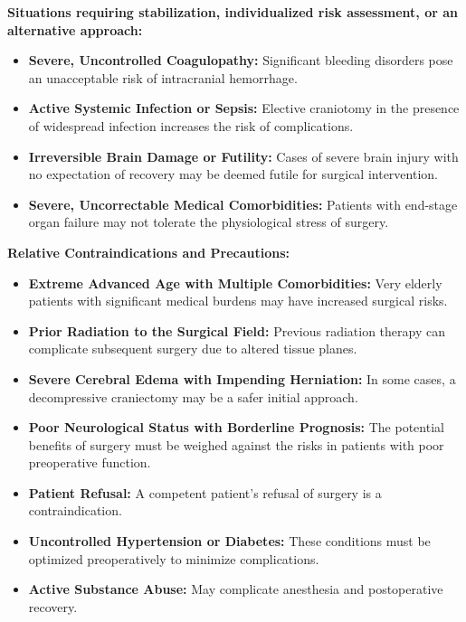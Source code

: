 \textbf{Situations requiring stabilization, individualized risk assessment, or an alternative approach:}
\begin{itemize}
  \item \textbf{Severe, Uncontrolled Coagulopathy:} Significant bleeding disorders pose an unacceptable risk of intracranial hemorrhage.
  
  \item \textbf{Active Systemic Infection or Sepsis:} Elective craniotomy in the presence of widespread infection increases the risk of complications.
  
  \item \textbf{Irreversible Brain Damage or Futility:} Cases of severe brain injury with no expectation of recovery may be deemed futile for surgical intervention.
  
  \item \textbf{Severe, Uncorrectable Medical Comorbidities:} Patients with end-stage organ failure may not tolerate the physiological stress of surgery.
\end{itemize}

\textbf{Relative Contraindications and Precautions:}
\begin{itemize}
  \item \textbf{Extreme Advanced Age with Multiple Comorbidities:} Very elderly patients with significant medical burdens may have increased surgical risks.
  
  \item \textbf{Prior Radiation to the Surgical Field:} Previous radiation therapy can complicate subsequent surgery due to altered tissue planes.
  
  \item \textbf{Severe Cerebral Edema with Impending Herniation:} In some cases, a decompressive craniectomy may be a safer initial approach.
  
  \item \textbf{Poor Neurological Status with Borderline Prognosis:} The potential benefits of surgery must be weighed against the risks in patients with poor preoperative function.
  
  \item \textbf{Patient Refusal:} A competent patient's refusal of surgery is a contraindication.
  
  \item \textbf{Uncontrolled Hypertension or Diabetes:} These conditions must be optimized preoperatively to minimize complications.
  
  \item \textbf{Active Substance Abuse:} May complicate anesthesia and postoperative recovery.
\end{itemize}

